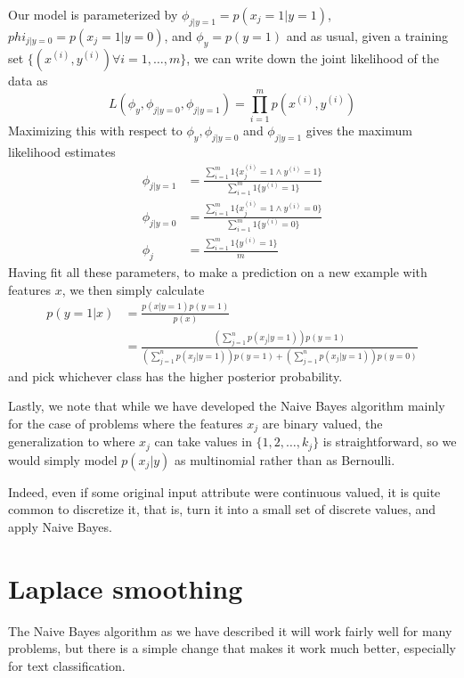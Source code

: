 Our model is parameterized by $\phi_{j | y = 1} = p(x_j = 1 | y = 1)$, $phi_{j | y = 0} = p(x_j = 1 | y = 0)$,
and $\phi_y = p(y = 1)$ and as usual, given a training set $\{(x^{(i)}, y^{(i)}) \forall i =1, \dots, m \}$,
we can write down the joint likelihood of the data as
\[ L(\phi_y, \phi_{j | y = 0}, \phi_{j | y = 1}) = \prod _{i = 1}^ m p(x^{(i)}, y^{(i)}) \]
Maximizing this with respect to $\phi_y, \phi_{j | y = 0}$ and $\phi_{j | y = 1}$ 
gives the maximum likelihood estimates
\begin{align*}
    \phi_{j | y = 1} & = \frac{\sum _{i=1} ^ m 1\{x_j^{(i)} = 1 \land y^{(i)} = 1\}}{\sum _{i=1}^m 1\{y^{(i)} = 1\}} \\
    \phi_{j | y = 0} & = \frac{\sum _{i=1} ^ m 1\{x_j^{(i)} = 1 \land y^{(i)} = 0\}}{\sum _{i=1}^m 1\{y^{(i)} = 0\}} \\
    \phi_j           &= \frac{\sum _{i=1} ^ m 1\{y^{(i)} = 1\}}{m}
\end{align*}
Having fit all these parameters, to make a prediction on a new example with features $x$,
we then simply calculate 
\begin{align*}
    p(y = 1 | x) & = \frac{p(x | y = 1)p(y = 1)}{p(x)} \\
                 & = \frac{\left(\sum _{j = 1}^n p(x_j | y = 1) \right) p(y = 1)}
                          {\left(\sum _{j = 1}^n p(x_j | y = 1) \right) p(y = 1) +
                           \left(\sum _{j = 1}^n p(x_j | y = 1) \right) p(y = 0)} 
\end{align*}
and pick whichever class has the higher posterior probability.

Lastly, we note that while we have developed the Naive Bayes algorithm mainly for the case of problems
where the features $x_j$ are binary valued, the generalization to where $x_j$ can take values in 
$\{1, 2, \dots, k_j\}$ is straightforward, so we would simply model $p(x_j | y)$ as multinomial rather
than as Bernoulli.

Indeed, even if some original input attribute were continuous valued, it is quite common to discretize it,
that is, turn it into a small set of discrete values, and apply Naive Bayes.

\section{Laplace smoothing}
The Naive Bayes algorithm as we have described it will work fairly well for many problems,
but there is a simple change that makes it work much better, especially for text classification.

